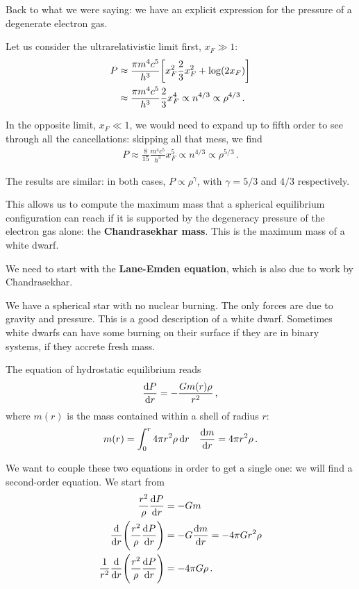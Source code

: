 \documentclass[main.tex]{subfiles}
\begin{document}

Back to what we were saying: we have an explicit expression for the pressure of a degenerate electron gas. 

Let us consider the ultrarelativistic limit first, \(x_F \gg 1\): 
%
\begin{align}
P &\approx \frac{\pi m^4 c^{5}}{h^3}
\qty[x_F^2 \frac{2}{3} x_F^2 + \log (2 x_F)]  \\
&\approx \frac{\pi m^4 c^{5}}{h^3} \frac{2}{3} x_F^{4} \propto n^{4/3} \propto \rho^{4/3}
\,.
\end{align}

In the opposite limit, \(x_F \ll 1\), we would need to expand up to fifth order to see through all the cancellations: skipping all that mess, we find
%
\begin{align}
P \approx \frac{8}{15} \frac{m^4 c^5}{h^3} x_F^{5} \propto n^{4/3}  \propto \rho^{5/3}
\,.
\end{align}

The results are similar: in both cases, \(P \propto \rho^{\gamma }\), with \(\gamma = 5/3\) and \(4/3\) respectively.

This allows us to compute the maximum mass that a spherical equilibrium configuration can reach if it is supported by the degeneracy pressure of the electron gas alone: the \textbf{Chandrasekhar mass}.
This is the maximum mass of a white dwarf. 

We need to start with the \textbf{Lane-Emden equation}, which is also due to work by Chandrasekhar. 

We have a spherical star with no nuclear burning. 
The only forces are due to gravity and pressure. This is a good description of a white dwarf. 
Sometimes white dwarfs can have some burning on their surface if they are in binary systems, if they accrete fresh mass. 

The equation of hydrostatic equilibrium reads 
%
\begin{align}
\dv{P}{r} = - \frac{G m(r) \rho }{r^2}
\,,
\end{align}
%
where \(m(r)\) is the mass contained within a shell of radius \(r\):
%
\begin{align}
m(r) = \int_0^{r} 4 \pi r^2 \rho \dd{r} 
&& 
\dv{m}{r} = 4 \pi r^2 \rho 
\,.
\end{align}

We want to couple these two equations in order to get a single one: we will find a second-order equation. 
We start from 
%
\begin{align}
\frac{r^2}{\rho }\dv{P}{r} &= - G m  \\
\dv{}{r} \qty(\frac{r^2}{\rho }\dv{P}{r}) &=
- G \dv{m}{r} = - 4 \pi G r^2 \rho  \\
\frac{1}{r^2} \dv{}{r} \qty( \frac{r^2}{\rho } \dv{P}{r}) &= - 4 \pi G \rho 
\,.
\end{align}
\end{document}
